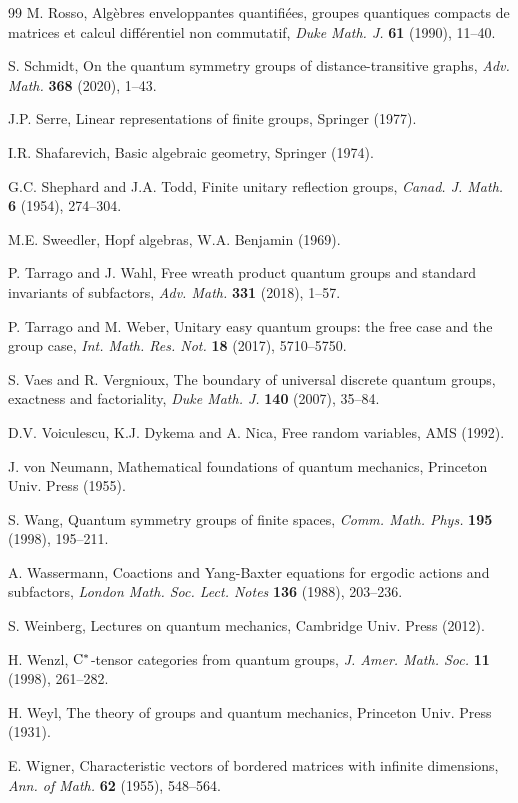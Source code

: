 \documentclass[12pt]{amsbook}
\begin{document}
\begin{thebibliography}{99}
M. Rosso, Alg\`ebres enveloppantes quantifi\'ees, groupes quantiques compacts de matrices et calcul diff\'erentiel non commutatif, {\em Duke Math. J.} {\bf 61} (1990), 11--40.

S. Schmidt, On the quantum symmetry groups of distance-transitive graphs, {\em Adv. Math.} {\bf 368} (2020), 1--43.

J.P. Serre, Linear representations of finite groups, Springer (1977).

I.R. Shafarevich, Basic algebraic geometry, Springer (1974).

G.C. Shephard and J.A. Todd, Finite unitary reflection groups, {\em Canad. J. Math.} {\bf 6} (1954), 274--304.

M.E. Sweedler, Hopf algebras, W.A. Benjamin (1969).

P. Tarrago and J. Wahl, Free wreath product quantum groups and standard invariants of subfactors, {\em Adv. Math.} {\bf 331} (2018), 1--57.

P. Tarrago and M. Weber, Unitary easy quantum groups: the free case and the group case, {\em Int. Math. Res. Not.} {\bf 18} (2017), 5710--5750.

S. Vaes and R. Vergnioux, The boundary of universal discrete quantum groups, exactness and factoriality, {\em Duke Math. J.} {\bf 140} (2007), 35--84.

D.V. Voiculescu, K.J. Dykema and A. Nica, Free random variables, AMS (1992).

J. von Neumann, Mathematical foundations of quantum mechanics, Princeton Univ. Press (1955).

S. Wang, Quantum symmetry groups of finite spaces, {\em Comm. Math. Phys.} {\bf 195} (1998), 195--211.

A. Wassermann, Coactions and Yang-Baxter equations for ergodic actions and subfactors, {\em London Math. Soc. Lect. Notes} {\bf 136} (1988), 203--236.

S. Weinberg, Lectures on quantum mechanics, Cambridge Univ. Press (2012).

H. Wenzl, ${\rm C}^*$-tensor categories from quantum groups, {\em J. Amer. Math. Soc.} {\bf 11} (1998), 261--282.

H. Weyl, The theory of groups and quantum mechanics, Princeton Univ. Press (1931).

E. Wigner, Characteristic vectors of bordered matrices with infinite dimensions, {\em Ann. of Math.} {\bf 62} (1955), 548--564. 


\end{thebibliography}
\end{document}
